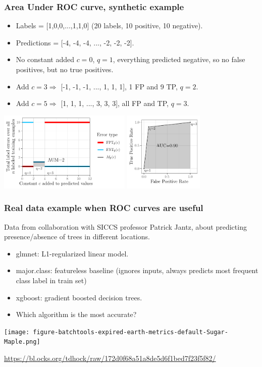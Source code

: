 \documentclass[t]{beamer}
\begin{document}
\begin{frame}
  \frametitle{Area Under ROC curve, synthetic example}

\begin{itemize}
  \item Labels = [1,0,0,...,1,1,0] (20 labels, 10 positive, 10 negative).
  \item Predictions = [-4, -4, -4, ..., -2, -2, -2].
  \item No constant added $c=0$, $q=1$, everything predicted negative,
    so no false positives, but no true positives.
\item Add $c=3 \Rightarrow$ [-1, -1, -1, ..., 1, 1, 1], 1 FP and
  9 TP, $q=2$.
\item  Add $c=5 \Rightarrow$ [1, 1, 1, ..., 3, 3, 3], all FP and TP, $q=3$.
  \end{itemize}

  \includegraphics[height=1.5in]{figure-more-than-one-less-aum-nomath}
  \includegraphics[height=1.5in]{figure-more-than-one-less-auc}

\end{frame}

\begin{frame}
  \frametitle{Real data example when ROC curves are useful}

  Data from collaboration with SICCS professor Patrick Jantz, about
  predicting presence/absence of trees in different locations.
  
  \begin{itemize}
  \item glmnet: L1-regularized linear model.
  \item major.class: featureless baseline (ignores inputs, always
    predicts most frequent class label in train set)
  \item xgboost: gradient boosted decision trees.
  \item Which algorithm is the most accurate?
  \end{itemize}
   
  \texttt{[image: figure-batchtools-expired-earth-metrics-default-Sugar-Maple.png]}

  \url{https://bl.ocks.org/tdhock/raw/172d0f68a51a8de5d6f1bed7f23f5f82/}
  
\end{frame}
\end{document}
